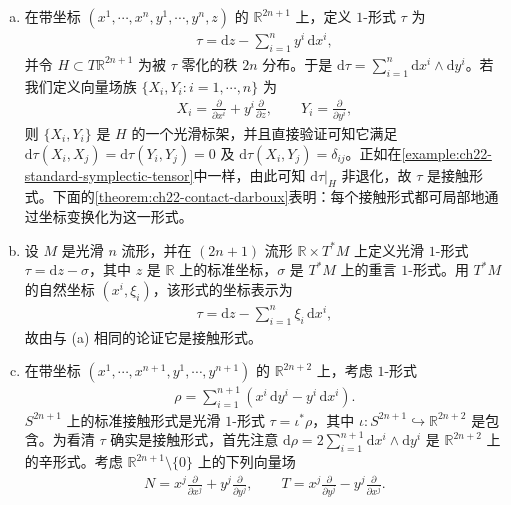 \documentclass[../../main.tex]{subfiles}
\begin{document}
\begin{example}[接触形式]\label{example:ch22-contact-forms}
\begin{enumerate}[(a)]
\item 在带坐标 $(x^1,\cdots ,x^n,y^1,\cdots ,y^n,z)$ 的 $\mathbb{R}^{2n+1}$ 上，定义 $1$-形式 $\tau$ 为
\begin{align}
\tau=\mathrm{d}z-\sum_{i=1}^n y^i\,\mathrm{d}x^i,
\end{align}
并令 $H\subset T\mathbb{R}^{2n+1}$ 为被 $\tau$ 零化的秩 $2n$ 分布。于是 $\mathrm{d}\tau=\sum_{i=1}^n\mathrm{d}x^i\wedge\mathrm{d}y^i$。若我们定义向量场族 $\{X_i,Y_i:i=1,\cdots ,n\}$ 为
\begin{align*}
X_i=\frac{\partial}{\partial x^i}+y^i\frac{\partial}{\partial z},\qquad
Y_i=\frac{\partial}{\partial y^i},
\end{align*}
则 $\{X_i,Y_i\}$ 是 $H$ 的一个光滑标架，并且直接验证可知它满足 $\mathrm{d}\tau(X_i,X_j)=\mathrm{d}\tau(Y_i,Y_j)=0$ 及 $\mathrm{d}\tau(X_i,Y_j)=\delta_{ij}$。正如在\cref{example:ch22-standard-symplectic-tensor}中一样，由此可知 $\mathrm{d}\tau|_H$ 非退化，故 $\tau$ 是接触形式。下面的\cref{theorem:ch22-contact-darboux}表明：每个接触形式都可局部地通过坐标变换化为这一形式。
\item 设 $M$ 是光滑 $n$ 流形，并在 $(2n+1)$ 流形 $\mathbb{R}\times T^*M$ 上定义光滑 $1$-形式 $\tau=\mathrm{d}z-\sigma$，其中 $z$ 是 $\mathbb R$ 上的标准坐标，$\sigma$ 是 $T^*M$ 上的重言 $1$-形式。用 $T^*M$ 的自然坐标 $(x^i,\xi_i)$，该形式的坐标表示为
\begin{align*}
\tau=\mathrm{d}z-\sum_{i=1}^n \xi_i\,\mathrm{d}x^i,
\end{align*}
故由与 (a) 相同的论证它是接触形式。
\item 在带坐标 $(x^1,\cdots ,x^{n+1},y^1,\cdots ,y^{n+1})$ 的 $\mathbb{R}^{2n+2}$ 上，考虑 $1$-形式
\begin{align*}
\rho=\sum_{i=1}^{n+1}(x^i\,\mathrm{d}y^i-y^i\,\mathrm{d}x^i).
\end{align*}
$S^{2n+1}$ 上的标准接触形式是光滑 $1$-形式 $\tau=\iota^*\rho$，其中 $\iota:S^{2n+1}\hookrightarrow\mathbb{R}^{2n+2}$ 是包含。为看清 $\tau$ 确实是接触形式，首先注意 $\mathrm{d}\rho=2\sum_{i=1}^{n+1}\mathrm{d}x^i\wedge\mathrm{d}y^i$ 是 $\mathbb{R}^{2n+2}$ 上的辛形式。考虑 $\mathbb{R}^{2n+1}\setminus\{0\}$ 上的下列向量场
\begin{align*}
N=x^j\frac{\partial}{\partial x^j}+y^j\frac{\partial}{\partial y^j},\qquad
T=x^j\frac{\partial}{\partial y^j}-y^j\frac{\partial}{\partial x^j}.
\end{align*}

\end{enumerate}
\end{example}
\end{document}
